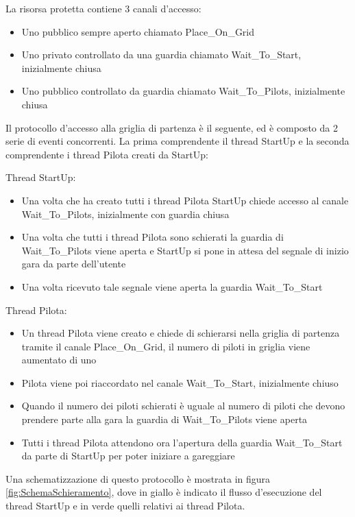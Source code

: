 \documentclass[a4paper,11pt, twoside, openright]{book}
\begin{document}
      La risorsa protetta contiene 3 canali d'accesso:
      \begin{itemize}
	\item Uno pubblico sempre aperto chiamato Place\_On\_Grid
	\item Uno privato controllato da una guardia chiamato  Wait\_To\_Start, inizialmente chiusa
	\item Uno pubblico controllato da guardia chiamato Wait\_To\_Pilots, inizialmente chiusa
      \end{itemize}
      
      Il protocollo d'accesso alla griglia di partenza è il seguente, ed è composto da 2 serie di eventi
      concorrenti. La prima comprendente il thread StartUp e la seconda comprendente i thread Pilota
      creati da StartUp:
      
      Thread StartUp:
      \begin{itemize}
	\item Una volta che ha creato tutti i thread Pilota StartUp chiede accesso al canale Wait\_To\_Pilots,
	      inizialmente con guardia chiusa
	\item Una volta che tutti i thread Pilota sono schierati la guardia di Wait\_To\_Pilots viene aperta e StartUp
	      si pone in attesa del segnale di inizio gara da parte dell'utente
	\item Una volta ricevuto tale segnale viene aperta la guardia Wait\_To\_Start
      \end{itemize}
      
      Thread Pilota:
      \begin{itemize}
	\item Un thread Pilota viene creato e chiede di schierarsi nella griglia di partenza tramite il canale Place\_On\_Grid,
              il numero di piloti in griglia viene aumentato di uno
	\item Pilota viene poi riaccordato nel canale Wait\_To\_Start, inizialmente chiuso
	\item Quando il numero dei piloti schierati è uguale al numero di piloti che devono prendere parte alla gara
	      la guardia di Wait\_To\_Pilots viene aperta
	\item Tutti i thread Pilota attendono ora l'apertura della guardia Wait\_To\_Start da parte di StartUp per
	      poter iniziare a gareggiare
      \end{itemize}
      
      Una schematizzazione di questo protocollo è mostrata in figura \ref{fig:SchemaSchieramento}, dove in giallo è indicato
      il flusso d'esecuzione del thread StartUp e in verde quelli relativi ai thread Pilota.
      
\end{document}
